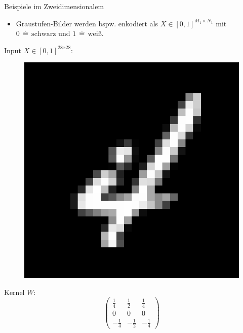 \documentclass[envcountsect, smaller, aspectratio=149]{beamer}
\begin{document}
\begin{frame}{Beispiele im Zweidimensionalem}
\begin{itemize}
    \item Graustufen-Bilder werden bspw. enkodiert als $X\in[0,1]^{M_1\times N_1}$ mit $0\, \hat= \,\text{schwarz}$ und $1\,\hat{=}\,\text{weiß}$.
\end{itemize}
\begin{center}
\begin{minipage}[t]{0.3\textwidth}
    \centering
    Input $X\in [0,1]^{28x28}$:
    \begin{figure}
        \includegraphics[width=\textwidth]{4.png}
    \end{figure}
\end{minipage}
\begin{minipage}[t]{0.3\textwidth}
    \centering
    Kernel $W$:
    \vspace{0.25\textwidth}
    \[
        \left(\begin{array}{ccc}
            \frac{1}{4} & \frac{1}{2} & \frac{1}{4} \\[4pt]
            0 & 0 & 0 \\[4pt]
            -\frac{1}{4} & -\frac{1}{2} & -\frac{1}{4}
        \end{array}\right)
    \]
\end{minipage}

\end{center}
\end{frame}
\end{document}
